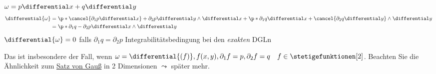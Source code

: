 \begin{beispiel*}
  \( \omega=p\differential x+q\differential y \) 
  \begin{align*}
      \differential{\omega} &=  \p*{ \cancel{\partial_1p\differential x}+\partial_2p\differential y }\wedge \differential x
      +\p*{ \partial_1 q\differential x+\cancel{\partial_2 q\differential y} }\wedge \differential y\\
      &= \p*{ \partial_1 q-\partial_2 p }\differential x\wedge \differential y
  \end{align*}
  \( \differential{\omega}=0 \) falls \( \partial_1q=\partial_2p \) Integrabilitätsbedingung bei den \emph{exakten} DGLn

  Das ist insbesondere der Fall, wenn \( \omega=\differential{(f)}, f(x,y),\partial_1f=p,\partial_2f=q\quad f\in \stetigefunktionen[2] \).
  Beachten Sie die Ähnlichkeit zum \hyperref[integralsatz_gauss]{Satz von Gauß} in 2 Dimensionen \( \leadsto \) später mehr.
\end{beispiel*}

